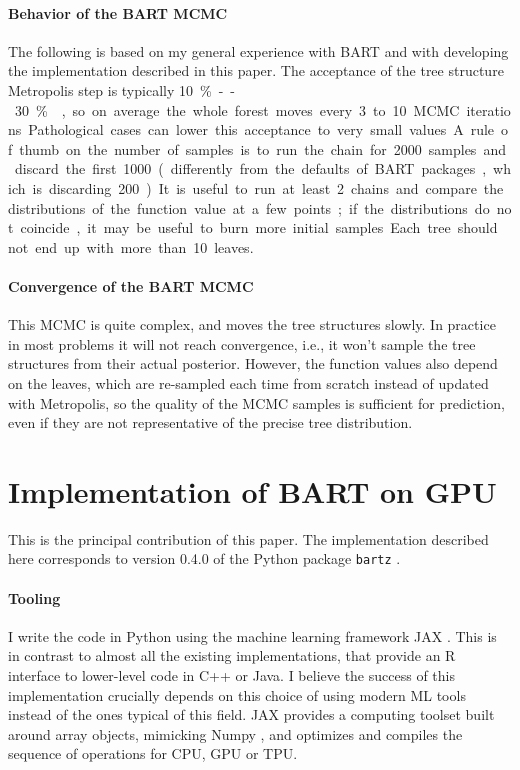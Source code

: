 \documentclass{article}
\begin{document}
    \paragraph{Behavior of the BART MCMC}

    The following is based on my general experience with BART and with developing the implementation described in this paper. The acceptance of the tree structure Metropolis step is typically \SI{10}\%--\SI{30}\% \autocite[see also][891]{pratola2016}, so on average the whole forest moves every 3 to 10 MCMC iterations. Pathological cases can lower this acceptance to very small values. A rule of thumb on the number of samples is to run the chain for 2000 samples and discard the first 1000 (differently from the defaults of BART packages, which is discarding 200). It is useful to run at least 2 chains and compare the distributions of the function value at a few points; if the distributions do not coincide, it may be useful to burn more initial samples. Each tree should not end up with more than 10 leaves.

    \paragraph{Convergence of the BART MCMC}

    This MCMC is quite complex, and moves the tree structures slowly. In practice in most problems it will not reach convergence, i.e., it won't sample the tree structures from their actual posterior. However, the function values also depend on the leaves, which are re-sampled each time from scratch instead of updated with Metropolis, so the quality of the MCMC samples is sufficient for prediction, even if they are not representative of the precise tree distribution.

    \section{Implementation of BART on GPU}

    This is the principal contribution of this paper. The implementation described here corresponds to version 0.4.0 of the Python package \texttt{bartz} \autocite{petrillo2024b}.

    \paragraph{Tooling}

    I write the code in Python using the machine learning framework JAX \autocite{bradbury2018}. This is in contrast to almost all the existing implementations, that provide an R interface to lower-level code in C++ or Java. I believe the success of this implementation crucially depends on this choice of using modern ML tools instead of the ones typical of this field. JAX provides a computing toolset built around array objects, mimicking Numpy \autocite{harris2020}, and optimizes and compiles the sequence of operations for CPU, GPU or TPU.
\end{document}
